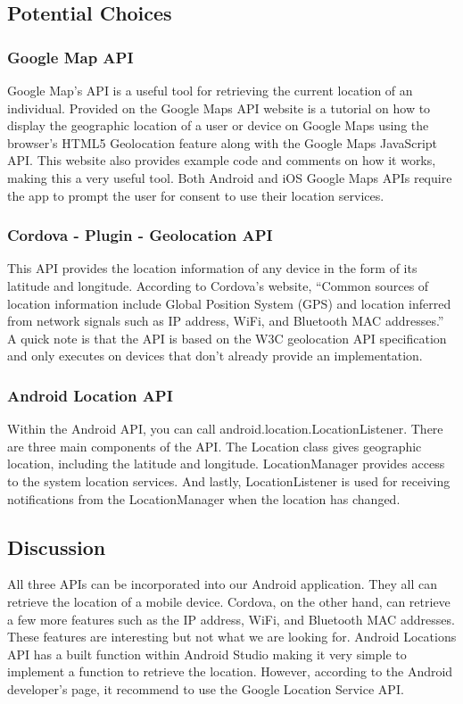 \documentclass[onecolumn, draftclsnofoot,10pt, compsoc]{IEEEtran}
\begin{document}
\subsection{Potential Choices}
\subsubsection{Google Map API}
Google Map’s API is a useful tool for retrieving the current location of an individual. Provided on the Google Maps API website is a tutorial on how to display the geographic location of a user or device on Google Maps using the browser's HTML5 Geolocation feature along with the Google Maps JavaScript API. This website also provides example code and comments on how it works, making this a very useful tool. Both Android and iOS Google Maps APIs require the app to prompt the user for consent to use their location services.\cite{GMaps}

\subsubsection{Cordova - Plugin - Geolocation API}
This API provides the location information of any device in the form of its latitude and longitude. According to Cordova's website, “Common sources of location information include Global Position System (GPS) and location inferred from network signals such as IP address, WiFi, and Bluetooth MAC addresses.” A quick note is that the API is based on the W3C geolocation API specification and only executes on devices that don’t already provide an implementation.\cite{cordova}

\subsubsection{Android Location API}
Within the Android API, you can call android.location.LocationListener. There are three main components of the API. The Location class gives geographic location, including the latitude and longitude. LocationManager provides access to the system location services. And lastly, LocationListener is used for receiving notifications from the LocationManager when the location has changed.\cite{Andriodlocal} 

\subsection{Discussion}
All three APIs can be incorporated into our Android application. They all can retrieve the location of a mobile device. Cordova, on the other hand, can retrieve a few more features such as the IP address, WiFi, and Bluetooth MAC addresses. These features are interesting but not what we are looking for. Android Locations API has a built function within Android Studio making it very simple to implement a function to retrieve the location. However, according to the Android developer's page, it recommend to use the Google Location Service API.\\
\end{document}

